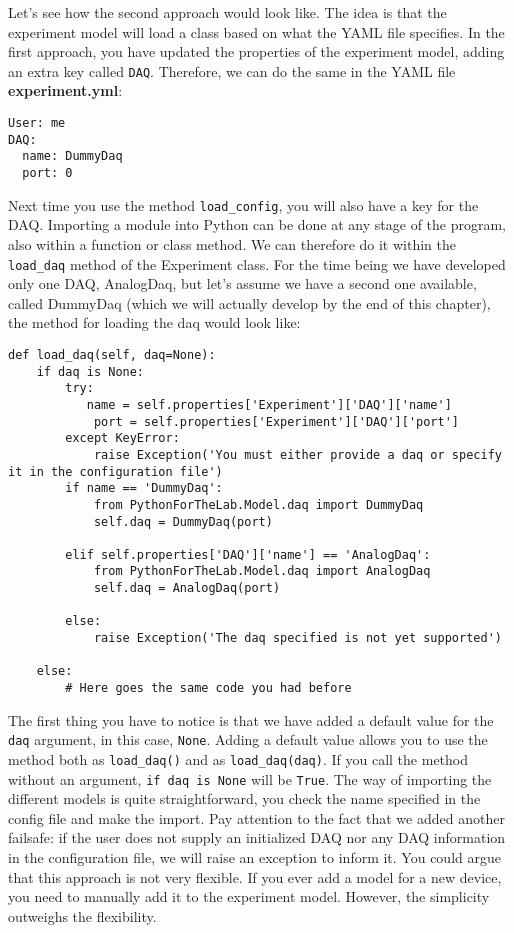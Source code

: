 Let's see how the second approach would look like. The idea is that the experiment model will load a class based on what the {YAML} file specifies. In the first approach, you have updated the properties of the
experiment model, adding an extra key called \texttt{DAQ}. Therefore, we can do the same in the {YAML} file \textbf{experiment.yml}:

\begin{verbatim}
User: me
DAQ:
  name: DummyDaq
  port: 0
\end{verbatim}

Next time you use the method \texttt{load_config}, you will also have a key for the {DAQ}. Importing a module into Python can be done at any stage of the program, also within a function or class method. We can therefore do it within the \texttt{load_daq} method of the Experiment class. For the time being we have developed only one DAQ, AnalogDaq, but let's assume we have a second one available, called DummyDaq (which we will actually develop by the end of this chapter), the method for loading the daq would look like:

\begin{verbatim}
def load_daq(self, daq=None):
    if daq is None:
        try:
           name = self.properties['Experiment']['DAQ']['name']
            port = self.properties['Experiment']['DAQ']['port']
        except KeyError:
            raise Exception('You must either provide a daq or specify it in the configuration file')
        if name == 'DummyDaq':
            from PythonForTheLab.Model.daq import DummyDaq
            self.daq = DummyDaq(port)
        
        elif self.properties['DAQ']['name'] == 'AnalogDaq':
            from PythonForTheLab.Model.daq import AnalogDaq
            self.daq = AnalogDaq(port)
        
        else:
            raise Exception('The daq specified is not yet supported')
    
    else:
        # Here goes the same code you had before
\end{verbatim}

The first thing you have to notice is that we have added a default value for the \texttt{daq} argument, in this case, \texttt{None}. Adding a default value allows you to use the
method both as \texttt{load_daq()} and as \texttt{load_daq(daq)}. If you call the method without an argument, \texttt{if daq is None} will be \texttt{True}. The way of importing the different models is quite straightforward, you check the name specified in the config file and make the import. Pay attention to the fact that we added another failsafe: if the user does not supply an initialized DAQ nor any DAQ information in the configuration file, we will raise an exception to inform it. You could argue that this approach is not very flexible. If you ever add a model for a new device, you need to manually add it to the experiment model. However, the simplicity outweighs the flexibility. 

